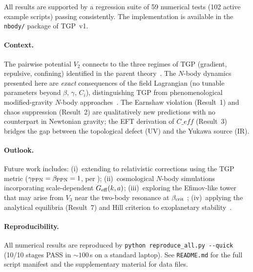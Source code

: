 \documentclass[11pt,a4paper]{article}
\def\Ceff{C\_eff}%
\newcommand{\Ceff}{C_{\rm eff}}
\begin{document}
\bigskip

All results are supported by a regression suite of 59 numerical tests
(102 active example scripts) passing consistently.  The implementation
is available in the \texttt{nbody/} package of TGP~v1.

\paragraph{Context.}
The pairwise potential $V_2$ connects to the three regimes of TGP
(gradient, repulsive, confining) identified in the parent
theory~\citep{Serafin2026}.  The $N$-body dynamics presented here are
\emph{exact} consequences of the field Lagrangian (no tunable
parameters beyond $\beta$, $\gamma$, $C_i$), distinguishing TGP from
phenomenological modified-gravity $N$-body
approaches~\citep{Puchwein2013,Li2012,Winther2015}.  The Earnshaw
violation (Result~1) and chaos suppression (Result~2) are qualitatively
new predictions with no counterpart in Newtonian gravity; the EFT
derivation of $\Ceff$ (Result~3) bridges the gap between the
topological defect (UV) and the Yukawa source (IR).

\paragraph{Outlook.}
Future work includes: (i)~extending to relativistic corrections using
the TGP metric ($\gamma_{\rm PPN} = \beta_{\rm PPN} = 1$, per
\citealt{Will2014}); (ii)~cosmological $N$-body simulations
incorporating scale-dependent $G_{\rm eff}(k,a)$;
(iii)~exploring the Efimov-like tower that may arise from
$V_3$ near the two-body resonance at $\beta_{\rm crit}$
\citep{Efimov1970,Braaten2006};
(iv)~applying the analytical equilibria (Result~7) and Hill criterion
to exoplanetary stability~\citep{Murray1999,Hamilton1992}.

\paragraph{Reproducibility.}
All numerical results are reproduced by
\texttt{python reproduce\_all.py -{}-quick}
(10/10 stages PASS in ${\sim}100$\,s on a standard laptop).
See \texttt{README.md} for the full script manifest
and the supplementary material for data files.


\end{document}
